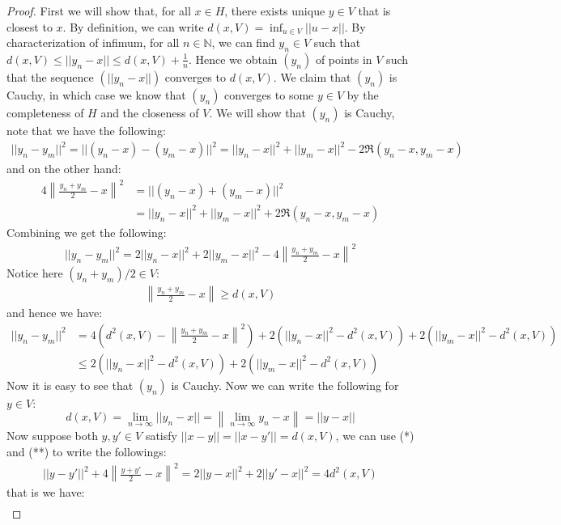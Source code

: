 \documentclass[11pt]{book}
\theoremstyle{break}
\theoremstyle{break}
\newcommand{\N}{\mathbb{N}}
\begin{document}
\begin{proof}
First we will show that, for all $x \in H$, there exists unique $y \in V$ that is closest to $x$. By definition, we can write $d(x,V) = \inf_{u \in V}||u - x||$. By characterization of infimum, for all $n \in \N$, we can find $y_n \in V$ such that $d(x,V) \leq ||y_n -x|| \leq d(x,V) + \frac{1}{n}$. Hence we obtain $(y_n)$ of points in $V$ such that the sequence $(||y_n - x||)$ converges to $d(x,V)$. We claim that $(y_n)$ is Cauchy, in which case we know that $(y_n)$ converges to some $y \in V$ by the completeness of $H$ and the closeness of $V$. We will show that $(y_n)$ is Cauchy, note that we have the following:
\begin{align*}
||y_n - y_m||^2 = ||(y_n - x) - (y_m-x) ||^2 = ||y_n - x||^2 + ||y_m -x||^2 - 2\Re(y_n - x, y_m -x)\tag{*}
\end{align*}
and on the other hand:
\begin{align*}
4 \left\| \frac{y_n + y_m}{2}-x\right\|^2 &= ||(y_n - x) + (y_m-x)||^2 \\
&= ||y_n - x||^2 + ||y_m -x||^2 + 2\Re(y_n-x, y_m-x) \tag{**}
\end{align*}
Combining we get the following:
\begin{align*}
||y_n - y_m||^2 = 2||y_n -x ||^2 + 2||y_m - x||^2 - 4\left\|\frac{y_n + y_m}{2}-x\right\|^2
\end{align*}
Notice here $(y_n + y_m)/2 \in V$:
\begin{align*}
\left\| \frac{y_n + y_m}{2}-x\right\| \geq d(x,V) 
\end{align*}
and hence we have:
\begin{align*}
||y_n-y_m||^2 &= 4 \left( d^2(x,V) - \left\|\frac{y_n + y_m}{2}-x\right\|^2\right) + 2 \left( ||y_n -x||^2 - d^2(x,V)\right) + 2\left( ||y_m - x||^2 - d^2(x,V)\right) \\
&\leq 2\left( ||y_n -x ||^2 - d^2(x,V) \right) + 2\left( ||y_m - x||^2 - d^2(x,V)\right)
\end{align*}
Now it is easy to see that $(y_n)$ is Cauchy. Now we can write the following for $y \in V$: 
$$d(x,V) = \lim_{n\to \infty}||y_n - x|| = \left\|\lim_{n\to \infty} y_n -x\right\| = ||y - x||$$
Now suppose both $y,y' \in V$ satisfy $||x-y|| = ||x- y'||  = d(x,V)$, we can use (*) and (**) to write the followings:
\begin{align*}
||y - y'||^2 + 4\left\| \frac{y+y'}{2}-x\right\|^2 = 2||y-x ||^2 + 2||y'-x||^2 = 4d^2(x,V)
\end{align*}
that is we have:
\begin{align*}

\end{align*}
\end{proof}
\end{document}
